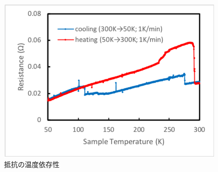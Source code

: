 \documentclass[11pt,a4paper]{jsarticle}
\begin{document}
\begin{figure}[h]
  \begin{center}
   \includegraphics[width=0.7\hsize]{resistance50-300.eps}
  \end{center}
  \caption{抵抗の温度依存性}
  \label{fig:resistance50-300}
\end{figure}
\end{document}
